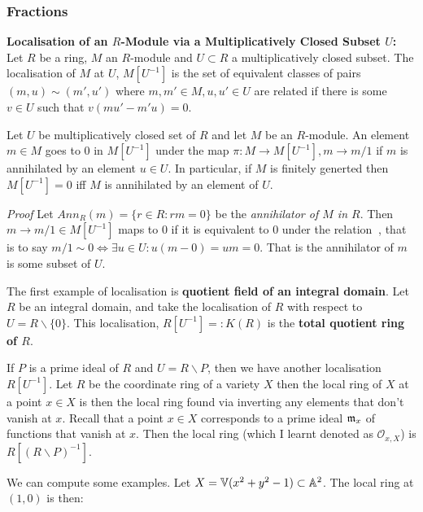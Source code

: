 \subsubsection{Fractions}
\begin{definition}
    \textbf{Localisation of an $R$-Module via a Multiplicatively Closed Subset $U$: }Let $R$ be a ring, $M$ an $R$-module and $U\subset R$ a multiplicatively closed subset. The localisation of $M$ at $U$, $M[U^{-1}]$ is the set of equivalent classes of pairs $(m,u) \sim (m', u')$ where $m,m' \in M, u,u' \in U$ are related if there is some $v\in U$ such that $v(mu' - m'u) = 0$. 
\end{definition}

\begin{proposition}
Let $U$ be  multiplicatively closed set of $R$ and let $M$ be an $R$-module. An element $m\in M$ goes to $0$ in $M[U^{-1}]$ under the map $\pi: M\to M[U^{-1}], m\to m/1$ if $m$ is annihilated by an element $u\in U$. In particular, if $M$ is finitely generted then $M[U^{-1}] = 0$ iff $M$ is annihilated by an element of $U$.
\end{proposition}
\textit{Proof} Let $Ann_R(m) = \{r\in R: rm = 0\}$ be the \textit{annihilator of $M$ in $R$}. Then $m\to m/1 \in M[U^{-1}]$ maps to $0$ if it is equivalent to $0$ under the relation $~$, that is to say $m/1\sim 0 \iff \exists u\in U : u(m - 0) = um = 0$. That is the annihilator of $m$ is some subset of $U$.

The first example of localisation is \textbf{quotient field of an integral domain}. Let $R$ be an integral domain, and take the localisation of $R$ with respect to $U = R\backslash \{0\}$. This localisation, $R[U^{-1}] =: K(R)$ is the \textbf{total quotient ring of $R$}. 

If $P$ is a prime ideal of $R$ and $U = R \backslash P$, then we have another localisation $R[U^{-1}]$. Let $R$ be the coordinate ring of a variety $X$ then the local ring of $X$ at a point $x\in X$ is then the local ring found via inverting any elements that don't vanish at $x$. Recall that a point $x\in X$ corresponds to a prime ideal $\mathfrak{m}_x$ of functions that vanish at $x$. Then the local ring (which I learnt denoted as $\mathcal{O}_{x,X}$) is $R[(R\backslash P)^{-1}]$. 

We can compute some examples. Let $X = \mathbb{V}(x^2 + y^2 - 1)\subset \mathbb{A}^2$. The local ring at $(1,0)$ is then:

